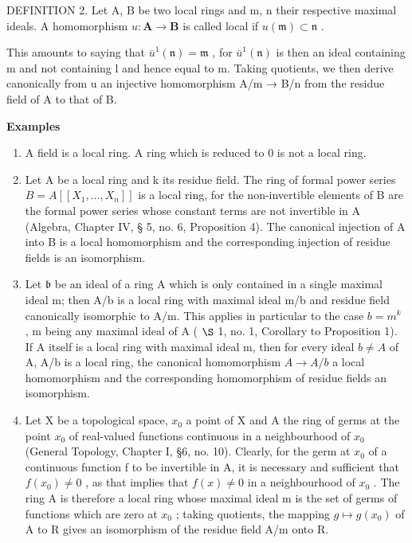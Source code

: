 DEFINITION 2. Let A, B be two local rings and m, n their respective maximal ideals. A homomorphism \(u: \mathbf{A} \to \mathbf{B}\) is called local if \(u(\mathfrak{m}) \subset \mathfrak{n}\) .

This amounts to saying that \(\bar{u}^{1}(\mathfrak{n}) = \mathfrak{m}\) , for \(\bar{u}^{1}(\mathfrak{n})\) is then an ideal containing m and not containing l and hence equal to m. Taking quotients, we then derive canonically from u an injective homomorphism A/m → B/n from the residue field of A to that of B.

\textbf{Examples}\par

\begin{enumerate}
\def\labelenumi{(\arabic{enumi})}
\item
  A field is a local ring. A ring which is reduced to 0 is not a local ring.
\item
  Let A be a local ring and k its residue field. The ring of formal power series \(B = A[[X_{1}, \ldots, X_{n}]]\) is a local ring, for the non-invertible elements of B are the formal power series whose constant terms are not invertible in A (Algebra, Chapter IV, § 5, no. 6, Proposition 4). The canonical injection of A into B is a local homomorphism and the corresponding injection of residue fields is an isomorphism.
\item
  Let \(\mathfrak{b}\) be an ideal of a ring A which is only contained in a single maximal ideal m; then A/b is a local ring with maximal ideal m/b and residue field canonically isomorphic to A/m. This applies in particular to the case \(b = m^{k}\) , m being any maximal ideal of A ( \(\S\) 1, no. 1, Corollary to Proposition 1). If A itself is a local ring with maximal ideal m, then for every ideal \(b \neq A\) of A, A/b is a local ring, the canonical homomorphism \(A \to A/b\) a local homomorphism and the corresponding homomorphism of residue fields an isomorphism.
\item
  Let X be a topological space, \(x_{0}\) a point of X and A the ring of germs at the point \(x_{0}\) of real-valued functions continuous in a neighbourhood of \(x_{0}\) (General Topology, Chapter I, §6, no. 10). Clearly, for the germ at \(x_{0}\) of a continuous function f to be invertible in A, it is necessary and sufficient that \(f(x_{0}) \neq 0\) , as that implies that \(f(x) \neq 0\) in a neighbourhood of \(x_{0}\) . The ring A is therefore a local ring whose maximal ideal m is the set of germs of functions which are zero at \(x_{0}\) ; taking quotients, the mapping \(g \mapsto g(x_{0})\) of A to R gives an isomorphism of the residue field A/m onto R.
\end{enumerate}

